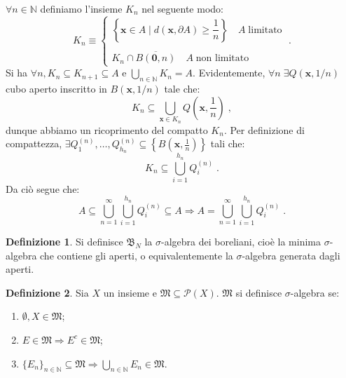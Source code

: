 \documentclass[a4paper,12pt]{report}
\theoremstyle{plain}
\theoremstyle{definition}
\newtheorem{defn}{Definizione}[section]
\theoremstyle{remark}
\numberwithin{equation}{section}
\begin{document}
\proof $\forall n \in \mathbb{N}$ definiamo l'insieme $K_n$ nel seguente modo:
\begin{equation}
K_n \equiv\begin{cases}
      \left\{\mathbf{x} \in A\;|\; d(\mathbf{x},\partial A)\ge \dfrac{1}{n}\right\}\quad A\;\mbox{limitato} \\
\\
K_n \cap \overline{B(\mathbf{0},n)}\quad A\;\mbox{non limitato}
     \end{cases}\;.
\end{equation}
Si ha $\forall n, K_n\subseteq K_{n+1}\subseteq A$ e $\bigcup_{n \in \mathbb{N}} K_n=A$. Evidentemente, $\forall n\; \exists Q\left(
\mathbf{x},1/n\right)$ cubo aperto inscritto in $B\left(\mathbf{x},1/n\right)$ tale che:
\begin{equation}
K_n \subseteq \bigcup_{\mathbf{x}\in K_n} Q\left(\mathbf{x},\frac{1}{n}\right)\;,
\end{equation}
dunque abbiamo un ricoprimento del compatto $K_n$. Per definizione di compattezza, $\exists Q_1^{(n)},\ldots,Q_{h_n}^{(n)} \subseteq 
\left\{B\left(\mathbf{x},\frac{1}{n}\right)\right\}$ tali che:
\begin{equation}
K_n \subseteq \bigcup_{i=1}^{h_n} Q_i^{(n)}\;.
\end{equation}
Da ciò segue che:
\begin{equation}
A \subseteq \bigcup_{n=1}^{\infty}\bigcup_{i=1}^{h_n} Q_i^{(n)} \subseteq A \Longrightarrow A=\bigcup_{n=1}^{\infty}\bigcup_{i=1}^{h_n} 
Q_i^{(n)}\;.
\end{equation}
\endproof
\begin{defn} Si definisce $\mathfrak{B}_N$ la $\sigma$-algebra dei boreliani, cioè la minima $\sigma$-algebra che contiene gli aperti, o 
equivalentemente la $\sigma$-algebra generata dagli aperti.
\end{defn}
\begin{defn} Sia $X$ un insieme e $\mathfrak{M}\subseteq \mathcal{P}(X)$. $\mathfrak{M}$ si definisce $\sigma$-algebra se:
\begin{enumerate}
 \item $\emptyset,X \in \mathfrak{M}$;
 \item $E \in \mathfrak{M} \Longrightarrow E^c \in \mathfrak{M}$;
 \item $\{E_n\}_{n \in \mathbb{N}} \subseteq \mathfrak{M} \Longrightarrow \bigcup_{n \in \mathbb{N}}E_n \in \mathfrak{M}$.
\end{enumerate}
\end{defn}
\end{document}
